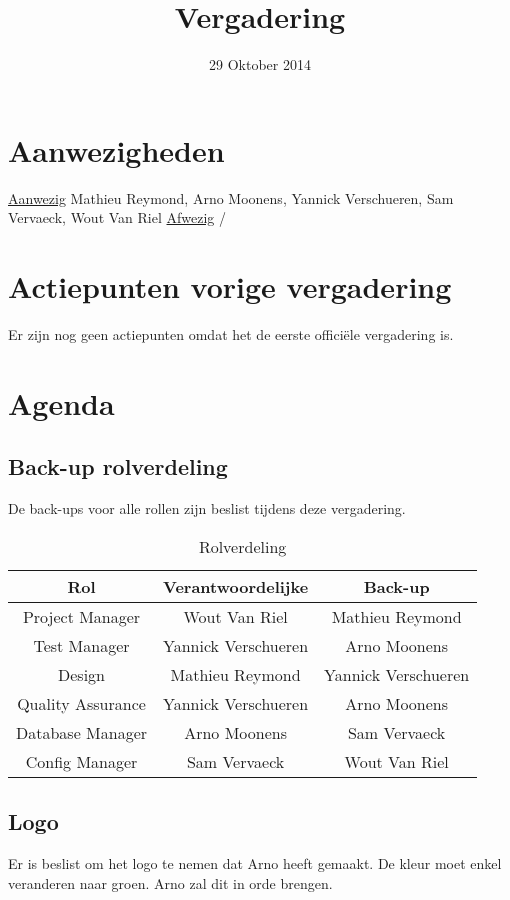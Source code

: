 \title{Vergadering}
\author{}
\date{29 Oktober 2014}



\maketitle

\section{Aanwezigheden}
\underline{Aanwezig}  \newline
Mathieu Reymond, Arno Moonens, Yannick Verschueren, Sam Vervaeck, Wout Van Riel
\newline
\underline{Afwezig} \newline
/

\section{Actiepunten vorige vergadering}
Er zijn nog geen actiepunten omdat het de eerste officiële vergadering is.

\section{Agenda}
\subsection{Back-up rolverdeling}
De back-ups voor alle rollen zijn beslist tijdens deze vergadering.
\begin{table}[h]
\centering
\begin{tabular}{c|c|c}
\textbf{Rol} & \textbf{Verantwoordelijke} & \textbf{Back-up}  \\
\hline
 Project Manager & Wout Van Riel & Mathieu Reymond \\
 Test Manager & Yannick Verschueren & Arno Moonens \\
 Design & Mathieu Reymond & Yannick Verschueren \\
 Quality Assurance & Yannick Verschueren & Arno Moonens \\
 Database Manager & Arno Moonens & Sam Vervaeck \\
 Config Manager & Sam Vervaeck & Wout Van Riel 
\end{tabular}
\caption{Rolverdeling}
\label{tab:rolverdeling}
\end{table}

\subsection{Logo}
Er is beslist om het logo te nemen dat Arno heeft gemaakt. De kleur moet enkel veranderen naar groen. Arno zal dit in orde brengen.

